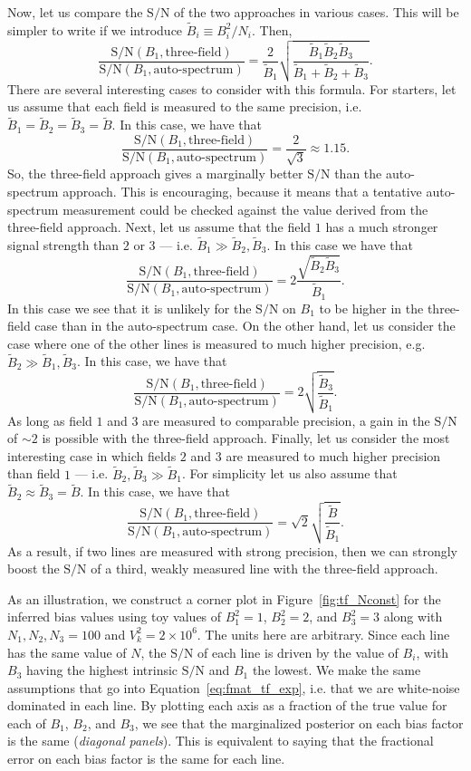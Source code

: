 \documentclass{aastex62}
\newcommand{\beq}{\begin{equation}}
\newcommand{\eeq}{\end{equation}}
\newcommand{\SN}{\ensuremath{\text{S}/\text{N}}}
\begin{document}
Now, let us compare the \SN{} of the two approaches in various cases. This
will be simpler to write if we introduce $\tilde{B}_i \equiv B_i^2/N_i$. Then,
\beq
\frac{\SN(B_1, \text{three-field})}{\SN(B_1, \text{auto-spectrum})} =
\frac{2}{\tilde{B}_1}
\sqrt{\frac{\tilde{B}_1\tilde{B}_2\tilde{B}_3}{\tilde{B}_1 + \tilde{B}_2 + \tilde{B}_3}}
\text{.}
\eeq
There are several interesting cases to consider with this formula. For
starters, let us assume that each field is measured to the same precision,
i.e. $\tilde{B}_1 = \tilde{B}_2 = \tilde{B}_3 = \tilde{B}$. In this case, we
have that
\beq
\frac{\SN(B_1, \text{three-field})}{\SN(B_1, \text{auto-spectrum})} =
\frac{2}{\sqrt{3}} \approx 1.15
\text{.}
\eeq
So, the three-field approach gives a marginally better \SN{} than the
auto-spectrum approach. This is encouraging, because it means that a tentative
auto-spectrum measurement could be checked against the value derived from the
three-field approach. Next, let us assume that the field $1$ has a much
stronger signal strength than $2$ or $3$ --- i.e. $\tilde{B}_1 \gg
\tilde{B}_2,\tilde{B}_3$. In this case we have that
\beq
\frac{\SN(B_1, \text{three-field})}{\SN(B_1, \text{auto-spectrum})} =
2\frac{\sqrt{\tilde{B}_2\tilde{B}_3}}{\tilde{B}_1}\text{.}
\eeq
In this case we see that it is unlikely for the $\text{S}/\text{N}$ on $B_1$
to be higher in the three-field case than in the auto-spectrum case. On the
other hand, let us consider the case where one of the other lines is measured
to much higher precision, e.g. $\tilde{B}_2 \gg \tilde{B}_1,\tilde{B}_3$. In
this case, we have that
\beq
\frac{\SN(B_1, \text{three-field})}{\SN(B_1, \text{auto-spectrum})} =
2\sqrt{\frac{\tilde{B}_3}{\tilde{B}_1}}\text{.}
\eeq
As long as field $1$ and $3$ are measured to comparable precision, a gain in
the \SN{} of $\sim2$ is possible with the three-field approach. Finally, let
us consider the most interesting case in which fields $2$ and $3$ are measured
to much higher precision than field $1$ --- i.e. $\tilde{B}_2, \tilde{B}_3 \gg
\tilde{B}_1$. For simplicity let us also assume that $\tilde{B}_2 \approx
\tilde{B}_3 = \tilde{B}$. In this case, we have that
\beq
\frac{\SN(B_1, \text{three-field})}{\SN(B_1, \text{auto-spectrum})} =
\sqrt{2}\sqrt{\frac{\tilde{B}}{\tilde{B}_1}}
\text{.}
\eeq
As a result, if two lines are measured with strong precision, then we can
strongly boost the \SN{} of a third, weakly measured line with the three-field
approach.

As an illustration, we construct a corner plot in Figure~\ref{fig:tf_Nconst}
for the inferred bias values using toy values of $B_1^2 = 1$, $B_2^2 = 2$, and
$B_3^2 = 3$ along with $N_1, N_2, N_3 = 100$ and $V_k^2 = 2\times10^6$. The
units here are arbitrary. Since each line has the same value of $N$, the \SN{}
of each line is driven by the value of $B_i$, with $B_3$ having the highest
intrinsic \SN{} and $B_1$ the lowest. We make the same assumptions that go
into Equation~\ref{eq:fmat_tf_exp}, i.e. that we are white-noise dominated in
each line. By plotting each axis as a fraction of the true value for each of
$B_1$, $B_2$, and $B_3$, we see that the marginalized posterior on each bias
factor is the same (\textit{diagonal panels}). This is equivalent to saying
that the fractional error on each bias factor is the same for each line.
\end{document}
